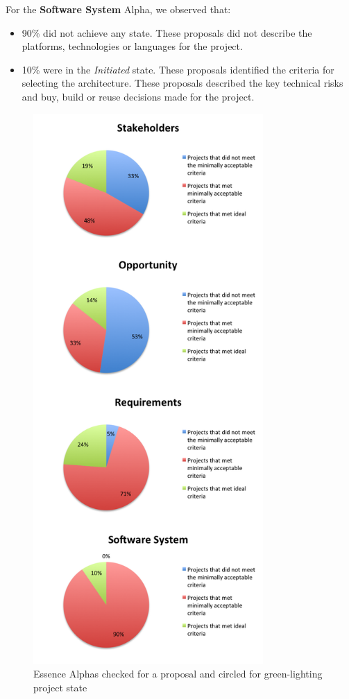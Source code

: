 \documentclass[conference]{IEEEtran}
\begin{document}
For the \textbf{Software System} Alpha, we observed that:
\begin{itemize}
\itemsep1pt\parskip0pt
\item
  90\% did not achieve any state. These proposals did not describe the
  platforms, technologies or languages for the project.
\item
  10\% were in the \textit{Initiated} state. These proposals identified the
  criteria for selecting the architecture. These proposals described the key technical risks and buy, build or reuse decisions made for the project.
\end{itemize}

\begin{figure}[!t]
\centering
\includegraphics[width=3.45in]{ProposalAlphasChartsStacked.png}
\caption{Essence Alphas checked for a proposal and circled for green-lighting project state}
\label{ProposalChart}
\end{figure}
\end{document}
